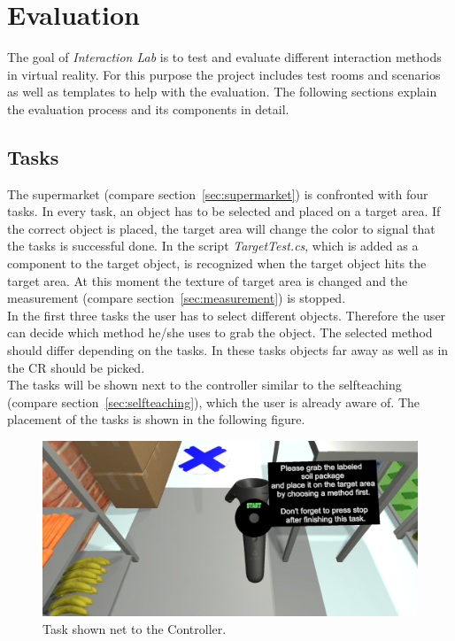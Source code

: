 \section{Evaluation} \label{sec:evaluation}

The goal of \textit{Interaction Lab} is to test and evaluate different interaction methods in virtual reality. For this purpose the project includes test rooms and scenarios as well as templates to help with the evaluation. The following sections explain the evaluation process and its components in detail.

\subsection{Tasks} \label{sec:tasks}
The supermarket (compare section~\ref{sec:supermarket}) is confronted with four tasks. In every task, an object has to be selected and placed on a target area. If the correct object is placed, the target area will change the color to signal that the tasks is successful done. In the script \textit{TargetTest.cs}, which is added as a component to the target object, is recognized when the target object hits the target area. At this moment the texture of target area is changed and the measurement (compare section~\ref{sec:measurement}) is stopped. \\
In the first three tasks the user has to select different objects. Therefore the user can decide which method he/she uses to grab the object. The selected method should differ depending on the tasks. In these tasks objects far away as well as in the CR should be picked. \\
The tasks will be shown next to the controller similar to the selfteaching (compare section~\ref{sec:selfteaching}), which the user is already aware of. The placement of the tasks is shown in the following figure. 

\begin{figure}[H] 
	\center 
	\includegraphics[width=12cm]{Images/TaskContreoller.PNG}
	\caption[Task shown next to the Controller.]{Task shown net to the Controller.}
	\label{fig:taskC}
\end{figure} 

